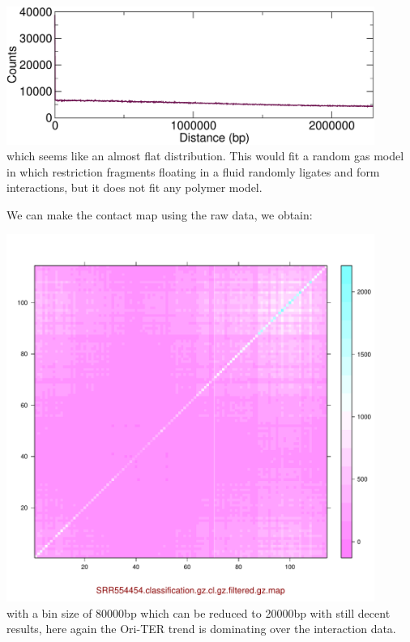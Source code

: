 \documentclass[12pt,a4paper,notitlepage]{article}
\begin{document}
\vspace{.5cm}\hspace{2cm}\includegraphics[width=12cm]{SRR554457dist}\\
which seems like an almost flat distribution. This would fit a random
gas model in which restriction fragments floating in a fluid randomly
ligates and form interactions, but it does not fit any polymer model.

We can make the contact map using the raw data, we obtain:

\vspace{.5cm}\hspace{2cm}\includegraphics[page=1,width=12cm]{out}\\
with a bin size of 80000bp which can be reduced to 20000bp with still
decent results, here again the Ori-TER trend is dominating over the
interaction data.
\end{document}
